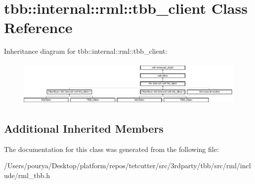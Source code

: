 \hypertarget{classtbb_1_1internal_1_1rml_1_1tbb__client}{}\section{tbb\+:\+:internal\+:\+:rml\+:\+:tbb\+\_\+client Class Reference}
\label{classtbb_1_1internal_1_1rml_1_1tbb__client}
Inheritance diagram for tbb\+:\+:internal\+:\+:rml\+:\+:tbb\+\_\+client\+:\begin{figure}[H]
\begin{center}
\leavevmode
\includegraphics[height=2.222222cm]{classtbb_1_1internal_1_1rml_1_1tbb__client}
\end{center}
\end{figure}
\subsection*{Additional Inherited Members}


The documentation for this class was generated from the following file\+:\begin{DoxyCompactItemize}
\item 
/\+Users/pourya/\+Desktop/platform/repos/tetcutter/src/3rdparty/tbb/src/rml/include/rml\+\_\+tbb.\+h\end{DoxyCompactItemize}
